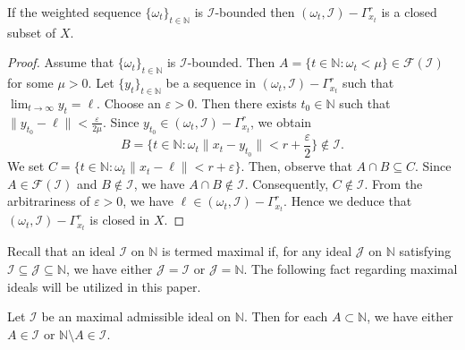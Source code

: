 \documentclass[reqno]{amsart}
\begin{document}
{\begin{proposition}\label{closedness cluster}
If the weighted sequence $\{\omega_t\}_{t\in\mathbb{N}}$ is $\mathcal{I}$-bounded then  $(\omega_t,\mathcal{I})-\Gamma_{x_t}^r$ is a closed subset of $X$.
\end{proposition}
\begin{proof}
	Assume that  $\{\omega_t\}_{t\in\mathbb{N}}$ is $\mathcal{I}$-bounded. Then  $A=\{t\in\mathbb{N}:\omega_t<\mu\}\in\mathcal{F}(\mathcal{I})$ for some $\mu>0$. Let $\{y_t\}_{t\in\mathbb{N}}$ be a sequence in $(\omega_t,\mathcal{I})-\Gamma_{x_t}^r$ such that $\displaystyle\lim_{t\to\infty}y_t=\ell$. Choose an $\varepsilon>0$. Then there exists $t_0\in\mathbb{N}$ such that $\|y_{t_0}-\ell\|<\frac{\varepsilon}{2\mu}$. Since $y_{t_0}\in (\omega_t,\mathcal{I})-\Gamma_{x_t}^r$, we obtain 
	$$
	B=\{t\in\mathbb{N}:\omega_t\|x_t-y_{t_0}\|<r+\frac{\varepsilon}{2}\}\notin\mathcal{I}.
	$$
	We set 
	$C=\{t\in\mathbb{N}:\omega_t\|x_t-\ell\|<r+\varepsilon\}$. Then, observe that $A\cap B\subseteq C$. Since $A\in\mathcal{F}(\mathcal{I})$ and $B\notin\mathcal{I}$, we have $A\cap B\notin\mathcal{I}$. Consequently, $C\notin\mathcal{I}$. From the arbitrariness of $\varepsilon>0$, we have $\ell\in (\omega_t,\mathcal{I})-\Gamma_{x_t}^r$. Hence we deduce that $(\omega_t,\mathcal{I})-\Gamma_{x_t}^r$ is closed in $X$.
\end{proof}
Recall that an ideal $\mathcal{I}$ on $\mathbb{N}$ is termed maximal if, for any ideal $\mathcal{J}$ on $\mathbb{N}$ satisfying $\mathcal{I} \subseteq \mathcal{J} \subseteq \mathbb{N}$, we have either \( \mathcal{J} = \mathcal{I} \) or $ \mathcal{J} = \mathbb{N}$. The following fact regarding maximal ideals will be utilized in this paper.

\begin{lemma}\cite[Lemma 5.1]{kostyrko2000convergence}\label{lemma maximal}
	Let $\mathcal{I}$ be an maximal admissible ideal on $\mathbb{N}$. Then for each $A\subset\mathbb{N}$, we have either $A\in\mathcal{I}$ or $\mathbb{N}\setminus A\in\mathcal{I}$.
\end{lemma}


}
\end{document}
